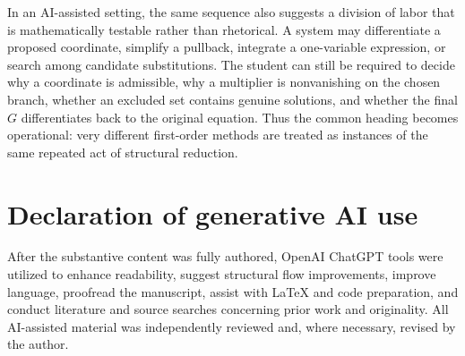 \documentclass[11pt]{article}
\theoremstyle{definition}
\begin{document}
In an AI-assisted setting, the same sequence also suggests a division of labor that is mathematically testable rather than rhetorical. A system may differentiate a proposed coordinate, simplify a pullback, integrate a one-variable expression, or search among candidate substitutions. The student can still be required to decide why a coordinate is admissible, why a multiplier is nonvanishing on the chosen branch, whether an excluded set contains genuine solutions, and whether the final $G$ differentiates back to the original equation. Thus the common heading becomes operational: very different first-order methods are treated as instances of the same repeated act of structural reduction.


\section*{Declaration of generative AI use}
After the substantive content was fully authored, OpenAI ChatGPT  tools were utilized to enhance readability, suggest structural flow improvements, improve language, proofread the manuscript, assist with LaTeX and code preparation, and conduct literature and source searches concerning prior work and originality. All AI-assisted material was independently reviewed and, where necessary, revised by the author. 
\end{document}
